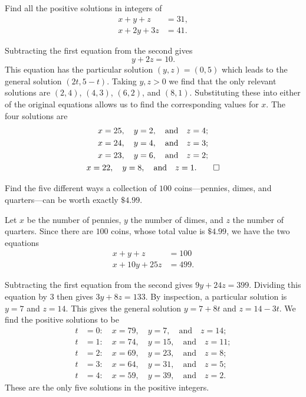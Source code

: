  Find all the positive solutions in integers of
\begin{align*}
  x + y + z &= 31, \\
  x + 2y + 3z &= 41.
\end{align*}
\begin{solution}
  Subtracting the first equation from the second gives
  \begin{equation*}
    y + 2z = 10.
  \end{equation*}
  This equation has the particular solution $(y,z) = (0,5)$ which
  leads to the general solution $(2t,5-t)$. Taking $y,z>0$ we find
  that the only relevant solutions are $(2,4)$, $(4,3)$, $(6,2)$, and
  $(8,1)$. Substituting these into either of the original equations
  allows us to find the corresponding values for $x$. The four
  solutions are
  \begin{gather*}
    x = 25,\quad y = 2,\quad\text{and}\quad z = 4; \\
    x = 24,\quad y = 4,\quad\text{and}\quad z = 3; \\
    x = 23,\quad y = 6,\quad\text{and}\quad z = 2; \\
    x = 22,\quad y = 8,\quad\text{and}\quad z = 1. \qedhere
  \end{gather*}
\end{solution}

 Find the five different ways a collection of $100$
coins---pennies, dimes, and quarters---can be worth exactly $\$4.99$.
\begin{solution}
  Let $x$ be the number of pennies, $y$ the number of dimes, and $z$
  the number of quarters. Since there are $100$ coins, whose total
  value is $\$4.99$, we have the two equations
  \begin{align*}
    x + y + z &= 100 \\
    x + 10y + 25z &= 499.
  \end{align*}

  Subtracting the first equation from the second gives
  $9y + 24z = 399$. Dividing this equation by $3$ then gives
  $3y + 8z = 133$. By inspection, a particular solution is $y = 7$ and
  $z = 14$. This gives the general solution $y = 7 + 8t$ and
  $z = 14 - 3t$. We find the positive solutions to be
  \begin{align*}
    t &= 0\colon\quad x = 79, \quad y = 7, \quad\text{and}\quad z = 14; \\
    t &= 1\colon\quad x = 74, \quad y = 15, \quad\text{and}\quad z = 11; \\
    t &= 2\colon\quad x = 69, \quad y = 23, \quad\text{and}\quad z = 8; \\
    t &= 3\colon\quad x = 64, \quad y = 31, \quad\text{and}\quad z = 5; \\
    t &= 4\colon\quad x = 59, \quad y = 39, \quad\text{and}\quad z = 2.
  \end{align*}
  These are the only five solutions in the positive integers.
\end{solution}
